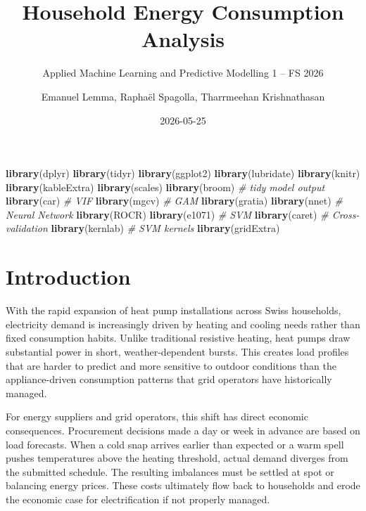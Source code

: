 \documentclass[
]{article}
\title{Household Energy Consumption Analysis}
\subtitle{Applied Machine Learning and Predictive Modelling 1 -- FS
2026}
\author{Emanuel Lemma, Raphaël Spagolla, Tharrmeehan Krishnathasan}
\date{2026-05-25}
\newenvironment{Shaded}{\begin{snugshade}}{\end{snugshade}}
\newcommand{\CommentTok}[1]{\textcolor[rgb]{0.56,0.35,0.01}{\textit{#1}}}
\newcommand{\FunctionTok}[1]{\textcolor[rgb]{0.13,0.29,0.53}{\textbf{#1}}}
\newcommand{\NormalTok}[1]{#1}
\begin{document}
\maketitle

{
\setcounter{tocdepth}{3}
\tableofcontents
}
\begin{Shaded}
\begin{Highlighting}[]
\FunctionTok{library}\NormalTok{(dplyr)}
\FunctionTok{library}\NormalTok{(tidyr)}
\FunctionTok{library}\NormalTok{(ggplot2)}
\FunctionTok{library}\NormalTok{(lubridate)}
\FunctionTok{library}\NormalTok{(knitr)}
\FunctionTok{library}\NormalTok{(kableExtra)}
\FunctionTok{library}\NormalTok{(scales)}
\FunctionTok{library}\NormalTok{(broom) }\CommentTok{\# tidy model output}
\FunctionTok{library}\NormalTok{(car) }\CommentTok{\# VIF}
\FunctionTok{library}\NormalTok{(mgcv) }\CommentTok{\# GAM}
\FunctionTok{library}\NormalTok{(gratia)}
\FunctionTok{library}\NormalTok{(nnet) }\CommentTok{\# Neural Network}
\FunctionTok{library}\NormalTok{(ROCR)}
\FunctionTok{library}\NormalTok{(e1071) }\CommentTok{\# SVM}
\FunctionTok{library}\NormalTok{(caret) }\CommentTok{\# Cross{-}validation}
\FunctionTok{library}\NormalTok{(kernlab) }\CommentTok{\# SVM kernels}
\FunctionTok{library}\NormalTok{(gridExtra)}
\end{Highlighting}
\end{Shaded}

\section{Introduction}\label{introduction}

With the rapid expansion of heat pump installations across Swiss
households, electricity demand is increasingly driven by heating and
cooling needs rather than fixed consumption habits. Unlike traditional
resistive heating, heat pumps draw substantial power in short,
weather-dependent bursts. This creates load profiles that are harder to
predict and more sensitive to outdoor conditions than the
appliance-driven consumption patterns that grid operators have
historically managed.

For energy suppliers and grid operators, this shift has direct economic
consequences. Procurement decisions made a day or week in advance are
based on load forecasts. When a cold snap arrives earlier than expected
or a warm spell pushes temperatures above the heating threshold, actual
demand diverges from the submitted schedule. The resulting imbalances
must be settled at spot or balancing energy prices. These costs
ultimately flow back to households and erode the economic case for
electrification if not properly managed.
\end{document}
